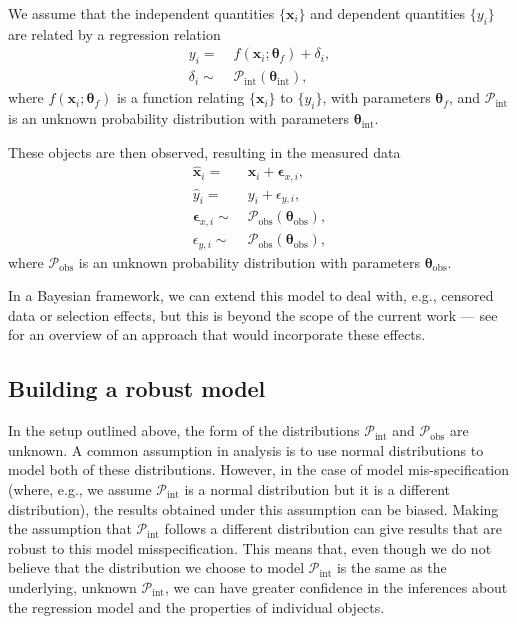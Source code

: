\documentclass[fleqn,usenatbib]{rasti}
\begin{document}
We assume that the independent quantities $\{\boldsymbol{x}_i\}$ and dependent
quantities $\{y_i\}$ are related by a regression relation
\begin{align}
    y_i =&\; f(\boldsymbol{x}_i; \boldsymbol{\theta}_f) + \delta_i, \\
    \delta_i \sim&\; \mathcal{P}_{\text{int}} \left( \boldsymbol{\theta}_{\text{int}} \right),
\end{align}
where $f(\boldsymbol{x}_i; \boldsymbol{\theta}_f)$ is a function relating
$\{\boldsymbol{x}_i\}$ to $\{y_i\}$, with parameters $\boldsymbol{\theta}_f$,
and $\mathcal{P}_{\text{int}}$ is an unknown probability distribution with
parameters $\boldsymbol{\theta}_{\text{int}}$.

These objects are then observed, resulting in the measured
data
\begin{align}
    \hat{\boldsymbol{x}}_i =&\; \boldsymbol{x}_i + \boldsymbol{\epsilon}_{x,i}, \\
    \hat{y}_i =&\; y_i + \epsilon_{y,i}, \\
    \boldsymbol{\epsilon}_{x,i} \sim&\; \mathcal{P}_{\text{obs}} \left( \boldsymbol{\theta}_{\text{obs}} \right), \\
    \epsilon_{y,i} \sim&\; \mathcal{P}_{\text{obs}} \left( \boldsymbol{\theta}_{\text{obs}} \right),
\end{align}
where $\mathcal{P}_{\text{obs}}$ is an unknown probability distribution with
parameters $\boldsymbol{\theta}_{\text{obs}}$.

In a Bayesian framework, we can extend this model to deal with, e.g., censored
data or selection effects, but this is beyond the scope of the current work ---
see \citet{Kelly:2007} for an overview of an approach that would incorporate
these effects.

\subsection{Building a robust model}
\label{sec:formalism.robust}

In the setup outlined above, the form of the distributions
$\mathcal{P}_{\text{int}}$ and $\mathcal{P}_{\text{obs}}$ are unknown. A common
assumption in analysis is to use normal distributions to model both of these
distributions. However, in the case of model mis-specification (where, e.g., we
assume $\mathcal{P}_{\text{int}}$ is a normal distribution but it is a different
distribution), the results obtained under this assumption can be biased. Making
the assumption that $\mathcal{P}_{\text{int}}$ follows a different distribution
can give results that are robust to this model misspecification. This means
that, even though we do not believe that the distribution we choose to model
$\mathcal{P}_{\text{int}}$ is the same as the underlying, unknown
$\mathcal{P}_{\text{int}}$, we can have greater confidence in the inferences
about the regression model and the properties of individual objects.
\end{document}
